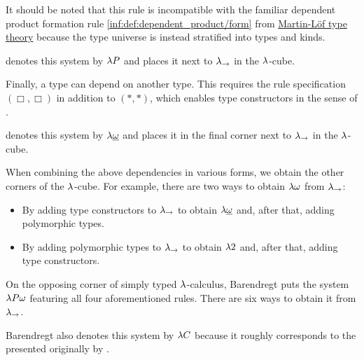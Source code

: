\begin{definition}
\begin{thmenum}
    It should be noted that this rule is incompatible with the familiar dependent product formation rule \ref{inf:def:dependent_product/form} from \hyperref[def:mltt]{Martin-L\"of type theory} because the type universe is instead stratified into types and kinds.

     denotes this system by \( {\mathrm \lambda} P \) and places it next to \( {\mathrm \lambda}_{\rightarrow} \) in the \( {\mathrm \lambda} \)-cube.

     Finally, a type can depend on another type. This requires the rule specification \( (\Box, \Box) \) in addition to \( (\ast, \ast) \), which enables type constructors in the sense of .

     denotes this system by \( {\mathrm \lambda} \underline \omega \) and places it in the final corner next to \( {\mathrm \lambda}_{\rightarrow} \) in the \( {\mathrm \lambda} \)-cube.

     When combining the above dependencies in various forms, we obtain the other corners of the \( {\mathrm \lambda} \)-cube. For example, there are two ways to obtain \( {\mathrm \lambda} \omega \) from \( {\mathrm \lambda}_{\rightarrow} \):
    \begin{itemize}
      \item By adding type constructors to \( {\mathrm \lambda}_{\rightarrow} \) to obtain \( {\mathrm \lambda} \underline \omega \) and, after that, adding polymorphic types.

      \item By adding polymorphic types to \( {\mathrm \lambda}_{\rightarrow} \) to obtain \( {\mathrm \lambda} 2 \) and, after that, adding type constructors.
    \end{itemize}

    On the opposing corner of simply typed \( {\mathrm \lambda} \)-calculus, Barendregt puts the system \( {\mathrm \lambda} P \omega \) featuring all four aforementioned rules. There are six ways to obtain it from \( {\mathrm \lambda}_{\rightarrow} \).

    Barendregt also denotes this system by \( {\mathrm \lambda} C \) because it roughly corresponds to the  presented originally by .
  \end{thmenum}
\end{definition}


